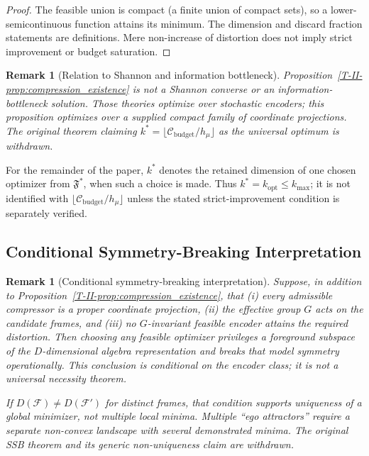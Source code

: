 \documentclass[12pt,a4paper,openany]{book}
\newtheorem{remark}[theorem]{Remark}
\begin{document}
\begin{proof}
The feasible union is compact (a finite union of compact sets), so a
lower-semicontinuous function attains its minimum.  The dimension and
discard fraction statements are definitions.  Mere non-increase of
distortion does not imply strict improvement or budget saturation.
\end{proof}

\begin{remark}[Relation to Shannon and information bottleneck]
Proposition~\ref{T-II-prop:compression_existence} is not a Shannon converse
or an information-bottleneck solution.  Those theories optimize over
stochastic encoders; this proposition optimizes over a supplied compact
family of coordinate projections.  The original theorem claiming
$k^*=\lfloor\mathcal C_{\mathrm{budget}}/h_\mu\rfloor$ as the universal
optimum is withdrawn.
\end{remark}

For the remainder of the paper, $k^*$ denotes the retained dimension of
one chosen optimizer from $\mathfrak F^*$, when such a choice is made.
Thus $k^*=k_{\mathrm{opt}}\leq k_{\max}$; it is not identified with
$\lfloor\mathcal C_{\mathrm{budget}}/h_\mu\rfloor$ unless the stated
strict-improvement condition is separately verified.

\subsection{Conditional Symmetry-Breaking Interpretation}
\label{T-II-subsec:SSB}

\begin{remark}[Conditional symmetry-breaking interpretation]
\label{T-II-rem:conditional_ssb}
Suppose, in addition to Proposition~\ref{T-II-prop:compression_existence},
that (i) every admissible compressor is a proper coordinate projection,
(ii) the effective group $G$ acts on the candidate frames, and
(iii) no $G$-invariant feasible encoder attains the required distortion.
Then choosing any feasible optimizer privileges a foreground subspace
of the $D$-dimensional algebra representation and breaks that model
symmetry operationally.  This conclusion is conditional on the encoder
class; it is not a universal necessity theorem.

If $D(\mathcal F)\neq D(\mathcal F')$ for distinct frames, that
condition supports uniqueness of a global minimizer, not multiple local
minima.  Multiple ``ego attractors'' require a separate non-convex
landscape with several demonstrated minima.  The original SSB theorem
and its generic non-uniqueness claim are withdrawn.
\end{remark}
\end{document}
